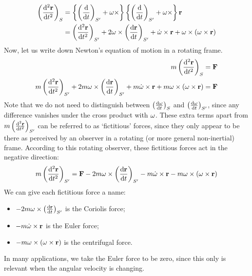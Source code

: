 \begin{align*}
	\left( \dv[2]{\vb r}{t} \right)_S & = \left\{ \left( \dv{t} \right)_{S'} + \vb\omega \times \right\} \left\{ \left( \dv{t} \right)_{S'} + \vb\omega \times \right\} \vb r                                     \\
	                                  & = \left( \dv[2]{\vb r}{t} \right)_{S'} + 2 \vb\omega \times \left( \dv{\vb r}{t} \right)_{S'} + \dot{\vb\omega} \times \vb r + \vb\omega \times (\vb \omega \times \vb r)
\end{align*}
Now, let us write down Newton's equation of motion in a rotating frame.
\begin{align*}
	m\left( \dv[2]{\vb r}{t} \right)_S                                                                                                                                          & = \vb F \\
	m\left( \dv[2]{\vb r}{t} \right)_{S'} + 2 m\vb\omega \times \left( \dv{\vb r}{t} \right)_{S'} + m\dot{\vb\omega} \times \vb r + m\vb\omega \times (\vb \omega \times \vb r) & = \vb F \\
\end{align*}
Note that we do not need to distinguish between \(\left( \dv{\vb\omega}{t} \right)_S\) and \(\left( \dv{\vb\omega}{t} \right)_{S'}\), since any difference vanishes under the cross product with \(\vb\omega\).
These extra terms apart from \(m\left( \dv[2]{\vb r}{t} \right)_{S'}\) can be referred to as `fictitious' forces, since they only appear to be there as perceived by an observer in a rotating (or more general non-inertial) frame.
According to this rotating observer, these fictitious forces act in the negative direction:
\[
	m\left( \dv[2]{\vb r}{t} \right)_{S'} = \vb F - 2 m\vb\omega \times \left( \dv{\vb r}{t} \right)_{S'} - m\dot{\vb\omega} \times \vb r - m\vb\omega \times (\vb \omega \times \vb r)
\]
We can give each fictitious force a name:
\begin{itemize}
	\item \(-2 m\vb\omega \times \left( \dv{\vb r}{t} \right)_{S'}\) is the Coriolis force;
	\item \(-m\dot{\vb\omega} \times \vb r\) is the Euler force;
	\item \(-m\vb\omega \times (\vb \omega \times \vb r)\) is the centrifugal force.
\end{itemize}
In many applications, we take the Euler force to be zero, since this only is relevant when the angular velocity is changing.
